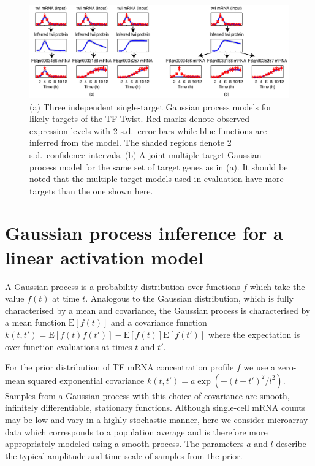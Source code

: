 \documentclass{pnastwo}
\begin{document}
\begin{article}
\begin{figure}[tb]
  \centering
  \includegraphics{dros_gpdisim_models}
  \caption{(a) Three independent single-target Gaussian process models
    for likely targets of the TF Twist. Red marks denote observed expression
    levels with 2 s.d.\ error bars while blue functions are inferred
    from the model.  The shaded regions denote 2 s.d.\ confidence
    intervals. (b) A joint multiple-target Gaussian process model for
    the same set of target genes as in (a). It should be noted that
    the multiple-target models used in evaluation have more targets
    than the one shown here.\label{fig:gpdisim_models}
}
\end{figure}

\section{Gaussian process inference for a linear activation model}

A Gaussian process is a probability distribution over
functions $f$ which take the value $f(t)$ at time
$t$. Analogous to the Gaussian distribution, which is fully
characterised by a mean and covariance, the Gaussian process is
characterised by a mean function $\mathrm{E}[f(t)]$ and a covariance
function $k(t,t')=\mathrm{E}[f(t)f(t')]-\mathrm{E}[f(t)]\mathrm{E}[f(t')]$
where the expectation is over function evaluations at times $t$ and
$t'$. 

For the prior distribution of TF mRNA concentration profile $f$ we use a zero-mean squared exponential covariance
$k(t,t')=a\exp(-(t-t')^2/l^2)$. Samples from a Gaussian process with this choice
of covariance are smooth, infinitely differentiable, stationary functions. Although single-cell mRNA counts may be low
and vary in a highly stochastic manner, here we consider microarray data which
corresponds to a population average and is therefore more
appropriately modeled using a smooth process. The parameters $a$ and
$l$ describe the typical amplitude and time-scale of samples from
the prior. 


\end{article}
\end{document}
